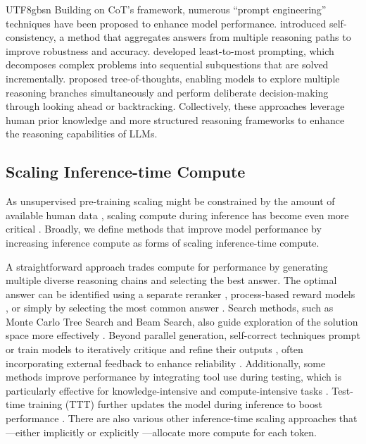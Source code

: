 \documentclass[11pt, a4paper, logo, copyright, nonumbering]{deepseek}
\begin{document}
\begin{CJK*}{UTF8}{gbsn}
Building on CoT's framework, numerous ``prompt engineering'' techniques have been proposed to enhance model performance.
\citet{wang2022self} introduced self-consistency, a method that aggregates answers from multiple reasoning paths to improve robustness and accuracy.
\citet{zhou2023leasttomost} developed least-to-most prompting, which decomposes complex problems into sequential subquestions that are solved incrementally. 
\citet{yao2023tree} proposed tree-of-thoughts, enabling models to explore multiple reasoning branches simultaneously and perform deliberate decision-making through looking ahead or backtracking.
Collectively, these approaches leverage human prior knowledge and more structured reasoning frameworks to enhance the reasoning capabilities of LLMs.

\subsection{Scaling Inference-time Compute}

As unsupervised pre-training scaling might be constrained by the amount of available human data \citep{kaplan2020scaling, muennighoff2023scaling}, scaling compute during inference has become even more critical \citep{snell2025scaling}. Broadly, we define methods that improve model performance by increasing inference compute as forms of scaling inference-time compute.

A straightforward approach trades compute for performance by generating multiple diverse reasoning chains and selecting the best answer. The optimal answer can be identified using a separate reranker \citep{gsm8k, brown2024large}, process-based reward models \citep{uesato2022solving, lightman2023let}, or simply by selecting the most common answer \citep{wang2022self}.
Search methods, such as Monte Carlo Tree Search and Beam Search, also guide exploration of the solution space more effectively \citep{hao2023reasoning, feng2024alphazeroliketreesearchguidelarge, xin2024deepseekproverv15harnessingproofassistant, AlphaGeometryTrinh2024}.
Beyond parallel generation, self-correct techniques prompt or train models to iteratively critique and refine their outputs \citep{welleck2023generating, madaan2023selfrefine, kumar2024training}, often incorporating external feedback to enhance reliability \citep{yao2023react, gou2024critic}.
Additionally, some methods improve performance by integrating tool use during testing, which is particularly effective for knowledge-intensive \citep{nakano2021webgpt} and compute-intensive tasks \citep{schick2023toolformer, gou2024tora, chen2025empirical}.
Test-time training (TTT) further updates the model during inference to boost performance \citep{sun2020test, akyurek2024surprising}. There are also various other inference-time scaling approaches that—either implicitly \citep{geiping2025scaling} or explicitly \citep{zelikman2024quietstar}—allocate more compute for each token.


\end{CJK*}
\end{document}
